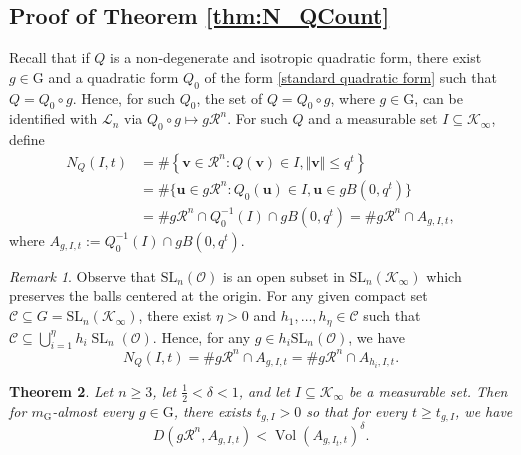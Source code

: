 \documentclass[11pt,a4paper,reqno]{amsart}
\newcommand{\SL}{\mathrm{SL}}
\newtheorem{theorem}{Theorem}[section]
\theoremstyle{definition}
\theoremstyle{remark}
\newtheorem{remark}[theorem]{Remark}
\numberwithin{equation}{section}
\begin{document}
\subsection{Proof of Theorem \ref{thm:N_QCount}}
Recall that if $Q$ is a non-degenerate and isotropic quadratic form, there exist $g\in \mathrm{G}$ and a quadratic form $Q_0$ of the form \eqref{standard quadratic form} such that $Q=Q_0\circ g$. Hence, for such $Q_0$, the set of $Q=Q_0\circ g$, where $g\in \mathrm{G}$, can be identified with $\mathcal{L}_n$ via $Q_0\circ g\mapsto g\mathcal{R}^n$. For such $Q$ and a measurable set $I\subseteq \mathcal{K}_{\infty}$, define
\begin{align*}
N_Q(I,t)&=\#\left\{\mathbf{v}\in \mathcal{R}^n:Q(\mathbf{v})\in I,\Vert \mathbf{v}\Vert\leq q^t\right\}
\\&=\#\{\mathbf{u}\in g\mathcal{R}^n:Q_0(\mathbf{u})\in I,\mathbf{u}\in gB(0,q^t)\}\\
&=\#g\mathcal{R}^n\cap Q_0^{-1}(I)\cap gB(0,q^t)
=\#g\mathcal R^n \cap A_{g,I,t},
\end{align*}
where $A_{g,I,t}:=Q_0^{-1}(I)\cap gB(0,q^t)$.
\begin{remark}
\label{rem:Covering}
Observe that $\SL_n(\mathcal O)$ is an open subset in $\SL_n(\mathcal K_\infty)$ which preserves the balls centered at the origin.
For any given compact set $\mathcal C\subseteq G=\SL_n(\mathcal K_\infty)$, there exist $\eta>0$ and $h_1,\dots,h_{\eta}\in \mathcal{C}$ such that $\mathcal{C}\subseteq \bigcup_{i=1}^{\eta}h_i\operatorname{SL}_n(\mathcal{O})$. Hence, for any $g\in h_i \SL_n(\mathcal O)$, we have
\[
N_Q(I,t)=\# g\mathcal R^n \cap A_{g,I,t}
=\# g\mathcal R^n \cap A_{h_i,I,t}.
\]
\end{remark}
\begin{theorem}
\label{thm:Disca.e.Small}
    Let $n\ge 3$, let $\frac 1 2 < \delta < 1$, and let $I\subseteq \mathcal{K}_{\infty}$ be a measurable set. Then for $m_\mathrm{G}$-almost every $g\in \mathrm{G}$, there exists $t_{g,I}>0$ so that for every $t\geq t_{g,I}$, we have
    $$D\left(g\mathcal{R}^n,A_{g,I,t}\right)<\operatorname{Vol}(A_{g,I_t,t})^{\delta}.$$
\end{theorem}
\end{document}
